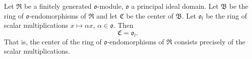 Let $\mathfrak{R}$ be a finitely generated $\mathfrak{o}$-module, $\mathfrak{o}$ a principal ideal domain. Let $\mathfrak{B}$ be the ring of $\mathfrak{o}$-endomorphisms of $\mathfrak{R}$ and let $\mathfrak{C}$ be the center of $\mathfrak{B}$. Let $\mathfrak{o}_l$ be the ring of scalar multiplications $x \mapsto \alpha x$, $\alpha \in \mathfrak{o}$. Then
$$\mathfrak{C} = \mathfrak{o}_l.$$
That is, the center of the ring of $\mathfrak{o}$-endomorphisms of $\mathfrak{R}$ consists precisely of the scalar multiplications.

